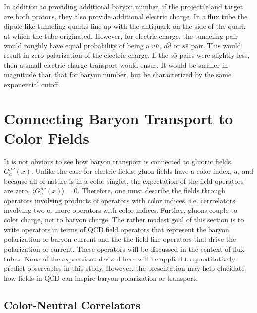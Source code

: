 \documentclass[aps, prc, 12pt, nofootinbib, showpacs, superscriptaddress, tightenlines, groupedaddress]{revtex4-2}
\begin{document}
In addition to providing additional baryon number, if the projectile and target are both protons, they also provide additional electric charge. In a flux tube the dipole-like tunneling quarks line up with the antiquark on the side of the quark at which the tube originated. However, for electric charge, the tunneling pair would roughly have equal probability of being a $u\bar{u},~d\bar{d}$ or $s\bar{s}$ pair. This would result in zero polarization of the electric charge. If the $s\bar{s}$ pairs were slightly less, then a small electric charge transport would ensue. It would be smaller in magnitude than that for baryon number, but be characterized by the same exponential cutoff. 

\section{Connecting Baryon Transport to Color Fields}\label{sec:kubo}

It is not obvious to see how baryon transport is connected to gluonic fields, $G^{\mu\nu}_a(x)$. Unlike the case for electric fields, gluon fields have a color index, $a$, and because all of nature is in a color singlet, the expectation of the field operators are zero, $\langle G^{\mu\nu}_a(x)\rangle=0$. Therefore, one must describe the fields through operators involving products of operators with color indices, i.e. corrrelators involving two or more operators with color indices. Further, gluons couple to color charge, not to baryon charge. The rather modest goal of this section is to write operators in terms of QCD field operators that represent the baryon polarization or baryon current and the the field-like operators that drive the polarization or current. These operators will be discussed in the context of flux tubes. None of the expressions derived here will be applied to quantitatively predict observables in this study. However, the presentation may help elucidate how fields in QCD can inspire baryon polarization or transport.

\subsection{Color-Neutral Correlators}
\end{document}
